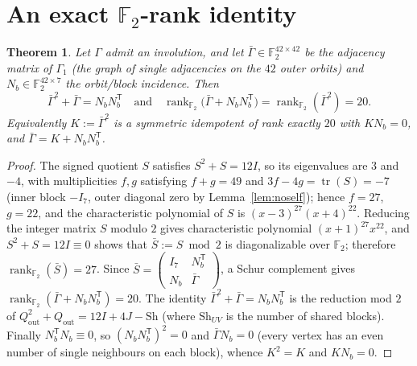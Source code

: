 \documentclass[11pt,a4paper]{article}
\newtheorem{theorem}{Theorem}
\theoremstyle{remark}
\newcommand{\F}{\mathbb{F}}
\newcommand{\rk}{\operatorname{rank}}
\begin{document}
\section{An exact $\F_2$-rank identity}
\begin{theorem}\label{thm:rank}
Let $\Gamma$ admit an involution, and let $\bar\Gamma\in\F_2^{42\times42}$ be the adjacency matrix of $\Gamma_1$ (the graph of single adjacencies on the $42$ outer orbits) and
$N_b\in\F_2^{42\times7}$ the orbit/block incidence. Then
\[
\bar\Gamma^2+\bar\Gamma=N_bN_b^{\mathsf T}\quad\text{and}\quad \rk_{\F_2}\bigl(\bar\Gamma+N_bN_b^{\mathsf T}\bigr)=\rk_{\F_2}(\bar\Gamma^2)=20 .
\]
Equivalently $K:=\bar\Gamma^2$ is a symmetric idempotent of rank exactly $20$ with $KN_b=0$, and $\bar\Gamma=K+N_bN_b^{\mathsf T}$.
\end{theorem}
\begin{proof}
The signed quotient $S$ satisfies $S^2+S=12I$, so its eigenvalues are $3$ and $-4$, with multiplicities $f,g$ satisfying $f+g=49$ and
$3f-4g=\operatorname{tr}(S)=-7$ (inner block $-I_7$, outer diagonal zero by Lemma~\ref{lem:noself}); hence $f=27$, $g=22$, and the characteristic
polynomial of $S$ is $(x-3)^{27}(x+4)^{22}$. Reducing the integer
matrix $S$ modulo $2$ gives characteristic polynomial $(x+1)^{27}x^{22}$, and $S^2+S=12I\equiv0$ shows that $\bar S:=S\bmod 2$ is diagonalizable over $\F_2$;
therefore $\rk_{\F_2}(\bar S)=27$. Since $\bar S=\begin{pmatrix}I_7&N_b^{\mathsf T}\\N_b&\bar\Gamma\end{pmatrix}$, a Schur complement gives
$\rk_{\F_2}(\bar\Gamma+N_bN_b^{\mathsf T})=20$. The identity $\bar\Gamma^2+\bar\Gamma=N_bN_b^{\mathsf T}$ is the reduction mod $2$ of
$Q_{\mathrm{out}}^2+Q_{\mathrm{out}}=12I+4J-\mathrm{Sh}$ (where $\mathrm{Sh}_{UV}$ is the number of shared blocks). Finally $N_b^{\mathsf T}N_b\equiv0$, so $(N_bN_b^{\mathsf T})^2=0$ and
$\bar\Gamma N_b=0$ (every vertex has an even number of single neighbours on each block), whence $K^2=K$ and $KN_b=0$.
\end{proof}
\end{document}
